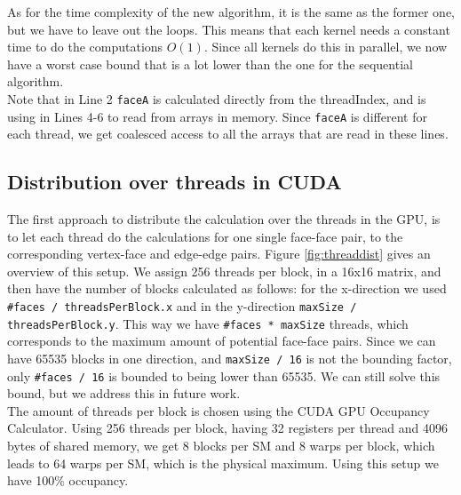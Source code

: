 As for the time complexity of the new algorithm, it is the same as the former one, but we have to leave out the loops. This means that each kernel needs a constant time to do the computations $O(1)$. Since all kernels do this in parallel, we now have a worst case bound that is a lot lower than the one for the sequential algorithm.\\

Note that in Line 2 \texttt{faceA} is calculated directly from the threadIndex, and is using in Lines 4-6 to read from arrays in memory. Since \texttt{faceA} is different for each thread, we get coalesced access to all the arrays that are read in these lines.

\subsection{Distribution over threads in CUDA}
\label{subsec:threads}
The first approach to distribute the calculation over the threads in the GPU, is to let each thread do the calculations for one single face-face pair, to the corresponding vertex-face and edge-edge pairs. Figure \ref{fig:threaddist} gives an overview of this setup. We assign 256 threads per block, in a 16x16 matrix, and then have the number of blocks calculated as follows: for the x-direction we used \texttt{\#faces / threadsPerBlock.x} and in the y-direction \texttt{maxSize / threadsPerBlock.y}. This way we have \texttt{\#faces * maxSize} threads, which corresponds to the maximum amount of potential face-face pairs. Since we can have 65535 blocks in one direction, and \texttt{maxSize / 16} is not the bounding factor, only \texttt{\#faces / 16} is bounded to being lower than 65535. We can still solve this bound, but we address this in future work.\\

The amount of threads per block is chosen using the CUDA GPU Occupancy Calculator. Using 256 threads per block, having 32 registers per thread and 4096 bytes of shared memory, we get 8 blocks per SM and 8 warps per block, which leads to 64 warps per SM, which is the physical maximum. Using this setup we have 100\% occupancy.

